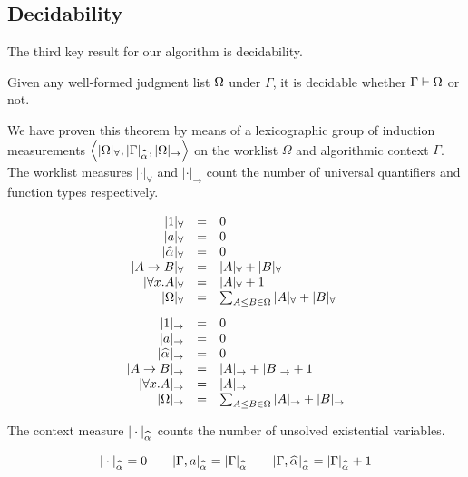 \subsection{Decidability}

The third key result for our algorithm is decidability.
\begin{theorem}[Decidability]
	Given any well-formed judgment list $\Omega$ under $\Gamma$, it is decidable whether $\Gamma\vdash \Omega$ or not.
\end{theorem}

\noindent We have proven this theorem by means of a lexicographic group of induction
measurements $\left\langle|\Omega|_\forall,|\Gamma|_{\al}, |\Omega|_\to\right\rangle$ on the worklist $\Omega$
and algorithmic context $\Gamma$. 
The worklist measures $|\cdot|_\forall$ and $|\cdot|_\to$ count the
number of universal quantifiers and function types respectively.
\begin{definition}
\[
\begin{array}{rcl}
|1|_\forall &=& 0    \\
|a|_\forall &=& 0    \\
|\al|_\forall &=& 0    \\
|A\to B|_\forall &=& |A|_\forall + |B|_\forall                        \\
|\forall x. A|_\forall &=& |A|_\forall + 1                            \\
|\exps|_\forall &=& \sum_{A \le B\in \exps} |A|_\forall + |B|_\forall \\[3mm]
|1|_\to  &=& 0   \\
|a|_\to &=& 0   \\
|\al|_\to &=& 0   \\
|A\to B|_\to &=& |A|_\to + |B|_\to + 1                       \\
|\forall x. A|_\to &=& |A|_\to                               \\
|\exps|_\to &=& \sum_{A \le B \in \exps} |A|_\to + |B|_\to
\end{array}
\]
\end{definition}

\noindent The context measure $|\cdot|_{\al}$ counts the number of unsolved existential variables.
\begin{definition}
$$|\cdot|_{\al} = 0\qquad
|\Gamma,a|_{\al} = |\Gamma|_{\al}\qquad
|\Gamma,\al|_{\al} = |\Gamma|_{\al} + 1$$
\end{definition}

